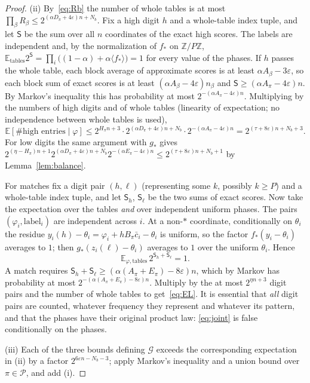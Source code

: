 \documentclass[11pt]{article}
\theoremstyle{definition}
\newcommand{\E}{\mathbb E}
\newcommand{\Z}{\mathbb Z}
\newcommand{\eps}{\varepsilon}
\newcommand{\bc}{\bar c}
\newcommand{\av}[1]{\langle #1\rangle}
\newcommand{\cG}{\mathcal G}
\newcommand{\cP}{\mathcal P}
\begin{document}
\begin{proof}
(ii) By~\eqref{eq:Rb} the number of whole tables is at most
$\prod_\beta R_\beta\le2^{(\alpha D_\pi+4\eps)n+N_b}$. Fix a high digit $h$ and a whole-table index tuple, and let
$\mathsf S$ be the sum over all $n$ coordinates of the exact high scores. The labels are independent and, by the
normalization of $f_\ast$ on $\Z/P\Z$,
$\E_{\text{tables}}2^{\mathsf S}=\prod_i\bigl((1-\alpha)+\alpha\av{f_\ast}\bigr)=1$ for every value of the phases. If
$h$ passes the whole table, each block average of approximate scores is at least $\alpha A_\beta-3\eps$, so each block
sum of exact scores is at least $(\alpha A_\beta-4\eps)n_\beta$ and $\mathsf S\ge(\alpha A_\pi-4\eps)n$. By Markov's
inequality this has probability at most $2^{-(\alpha A_\pi-4\eps)n}$. Multiplying by the numbers of high digits and of
whole tables (linearity of expectation; no independence between whole tables is used),
\[
 \E[\#\text{high entries}\mid\varphi]\le2^{H_\pi n+3}\cdot2^{(\alpha D_\pi+4\eps)n+N_b}\cdot2^{-(\alpha A_\pi-4\eps)n}=2^{(\tau+8\eps)n+N_b+3}.
\]
For low digits the same argument with $g_\ast$ gives
$2^{(\eta-H_\pi)n+1}2^{(\alpha D_\pi+4\eps)n+N_b}2^{-(\alpha E_\pi-4\eps)n}\le2^{(\tau+8\eps)n+N_b+1}$ by
Lemma~\ref{lem:balance}.

For matches fix a digit pair $(h,\ell)$ (representing some $k$, possibly $k\ge P$) and a whole-table index tuple, and
let $\mathsf S_h$, $\mathsf S_\ell$ be the two sums of exact scores. Now take the expectation over the tables
\emph{and} over independent uniform phases. The pairs $(\varphi_i,\text{label}_i)$ are independent across $i$. At a
non-$\ast$ coordinate, conditionally on $\theta_i$ the residue $y_i(h)-\theta_i=\varphi_i+hB_\pi\bc_i-\theta_i$ is
uniform, so the factor $f_\ast(y_i-\theta_i)$ averages to $1$; then $g_\ast(z_i(\ell)-\theta_i)$ averages to $1$ over
the uniform $\theta_i$. Hence
\begin{equation}\label{eq:joint}
 \E_{\varphi,\text{tables}}\,2^{\mathsf S_h+\mathsf S_\ell}=1 .
\end{equation}
A match requires $\mathsf S_h+\mathsf S_\ell\ge(\alpha(A_\pi+E_\pi)-8\eps)n$, which by Markov has probability at
most $2^{-(\alpha(A_\pi+E_\pi)-8\eps)n}$. Multiply by the at most $2^{\eta n+3}$ digit pairs and the number of whole
tables to get~\eqref{eq:EL}. It is essential that \emph{all} digit pairs are counted, whatever frequency they
represent and whatever its pattern, and that the phases have their original product law: \eqref{eq:joint} is false
conditionally on the phases.

(iii) Each of the three bounds defining $\cG$ exceeds the corresponding expectation in (ii) by a factor
$2^{6\eps n-N_b-3}$; apply Markov's inequality and a union bound over $\pi\in\cP$, and add (i).
\end{proof}
\end{document}
